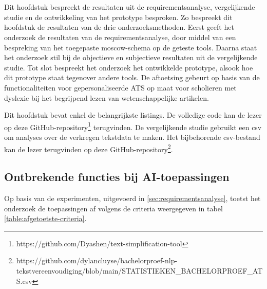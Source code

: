 \chapter{}%
\label{ch:resultaten}

Dit hoofdstuk bespreekt de resultaten uit de requirementsanalyse, vergelijkende studie en de ontwikkeling van het prototype besproken. Zo bespreekt dit hoofdstuk de resultaten van de drie onderzoeksmethoden. Eerst geeft het onderzoek de resultaten van de requirementsanalyse, door middel van een bespreking van het toegepaste moscow-schema op de geteste tools. Daarna staat het onderzoek stil bij de objectieve en subjectieve resultaten uit de vergelijkende studie. Tot slot bespreekt het onderzoek het ontwikkelde prototype, alsook hoe dit prototype staat tegenover andere tools. De aftoetsing gebeurt op basis van de functionaliteiten voor gepersonaliseerde ATS op maat voor scholieren met dyslexie bij het begrijpend lezen van wetenschappelijke artikelen. 

Dit hoofdstuk bevat enkel de belangrijkste listings. De volledige code kan de lezer op deze GitHub-repository\footnote{https://github.com/Dyashen/text-simplification-tool} terugvinden. De vergelijkende studie gebruikt een csv om analyses over de verkregen tekstdata te maken. Het bijbehorende csv-bestand kan de lezer terugvinden op deze GitHub-repository\footnote{https://github.com/dylancluyse/bachelorproef-nlp-tekstvereenvoudiging/blob/main/STATISTIEKEN_BACHELORPROEF_ATS.csv}.

\section{Ontbrekende functies bij AI-toepassingen}

Op basis van de experimenten, uitgevoerd in \ref{sec:requirementsanalyse}, toetst het onderzoek de toepassingen af volgens de criteria weergegeven in tabel \ref{table:afgetoetste-criteria}.

